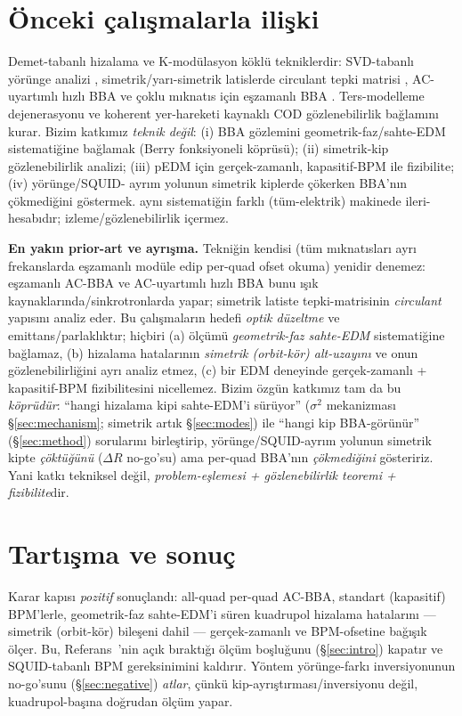 \documentclass[twocolumn,a4paper,10pt]{article}
\begin{document}
\section{Önceki çalışmalarla ilişki}
\label{sec:priorart}
Demet-tabanlı hizalama ve K-modülasyon köklü tekniklerdir: SVD-tabanlı yörünge
analizi \cite{chung1993}, simetrik/yarı-simetrik latislerde circulant tepki
matrisi \cite{mirza2019}, AC-uyartımlı hızlı BBA \cite{fastbba2020} ve
çoklu mıknatıs için eşzamanlı BBA \cite{huang2022}. Ters-modelleme
dejenerasyonu \cite{wegscheider2023} ve koherent yer-hareketi kaynaklı COD
\cite{rossbach1989} gözlenebilirlik bağlamını kurar. Bizim katkımız
\emph{teknik değil}: (i) BBA gözlemini geometrik-faz/sahte-EDM sistematiğine
bağlamak (Berry fonksiyoneli köprüsü); (ii) simetrik-kip gözlenebilirlik analizi;
(iii) pEDM için gerçek-zamanlı, kapasitif-BPM ile fizibilite; (iv) yörünge/SQUID-
ayrım yolunun simetrik kiplerde çökerken BBA'nın çökmediğini göstermek.
\cite{haciomeroglu2017} aynı sistematiğin farklı (tüm-elektrik) makinede
ileri-hesabıdır; izleme/gözlenebilirlik içermez.

\textbf{En yakın prior-art ve ayrışma.} Tekniğin kendisi (tüm mıknatısları ayrı
frekanslarda eşzamanlı modüle edip per-quad ofset okuma) yenidir denemez:
eşzamanlı AC-BBA \cite{huang2022} ve AC-uyartımlı hızlı BBA \cite{fastbba2020}
bunu ışık kaynaklarında/sinkrotronlarda yapar; \cite{mirza2019} simetrik latiste
tepki-matrisinin \emph{circulant} yapısını analiz eder. Bu çalışmaların hedefi
\emph{optik düzeltme} ve emittans/parlaklıktır; hiçbiri (a) ölçümü
\emph{geometrik-faz sahte-EDM} sistematiğine bağlamaz, (b) hizalama hatalarının
\emph{simetrik (orbit-kör) alt-uzayını} ve onun gözlenebilirliğini ayrı analiz
etmez, (c) bir EDM deneyinde gerçek-zamanlı + kapasitif-BPM fizibilitesini
nicellemez. Bizim özgün katkımız tam da bu \emph{köprüdür}: ``hangi
hizalama kipi sahte-EDM'i sürüyor'' ($\sigma^2$ mekanizması §\ref{sec:mechanism};
simetrik artık §\ref{sec:modes}) ile ``hangi kip BBA-görünür'' (§\ref{sec:method})
sorularını birleştirip, yörünge/SQUID-ayrım yolunun simetrik kipte \emph{çöktüğünü}
($\Delta R$ no-go'su) ama per-quad BBA'nın \emph{çökmediğini} gösteririz. Yani
katkı tekniksel değil, \emph{problem-eşlemesi + gözlenebilirlik teoremi +
fizibilite}dir.

\section{Tartışma ve sonuç}
\label{sec:conclusion}
Karar kapısı \emph{pozitif} sonuçlandı: all-quad per-quad AC-BBA, standart
(kapasitif) BPM'lerle, geometrik-faz sahte-EDM'i süren kuadrupol hizalama
hatalarını --- simetrik (orbit-kör) bileşeni dahil --- gerçek-zamanlı ve
BPM-ofsetine bağışık ölçer. Bu, Referans~\cite{omarov2022}'nin açık bıraktığı
ölçüm boşluğunu (\S\ref{sec:intro}) kapatır ve SQUID-tabanlı BPM gereksinimini
kaldırır. Yöntem yörünge-farkı inversiyonunun no-go'sunu (\S\ref{sec:negative})
\emph{atlar}, çünkü kip-ayrıştırması/inversiyonu değil, kuadrupol-başına doğrudan
ölçüm yapar.
\end{document}
